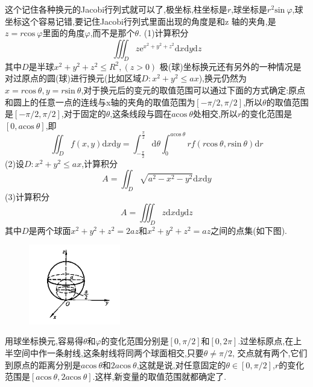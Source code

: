 \documentclass{ctexart}
\begin{document}
\tableofcontents
\newpage
\section{}

这个记住各种换元的Jacobi行列式就可以了,极坐标,柱坐标是$r$,球坐标是$r^{2}\mathrm{sin}\ \varphi$,球坐标这个容易记错,要记住Jacobi行列式里面出现的角度是和z 轴的夹角,是$z=r\mathrm{cos}\ \varphi$里面的角度$\varphi$,而不是那个$\theta$.
\newline
\newline
(1)计算积分$$\iiint_{D}z\mathrm{e}^{x^{2}+y^{2}+z^{2}}\mathrm{d}x\mathrm{d}y\mathrm{d}z$$
其中$D$是半球$x^{2}+y^{2}+z^{2}\leq R^{2},(z>0)$
\newline
\newline
极(球)坐标换元还有另外的一种情况是对过原点的圆(球)进行换元(比如区域$D:x^{2}+y^{2}\leq ax$),换元仍然为$x=r\mathrm{cos}\ \theta,y=r\mathrm{sin}\ \theta$,对于换元后的变元的取值范围可以通过下面的方式确定:原点和圆上的任意一点的连线与x轴的夹角的取值范围为$[-\pi/2,\pi/2]$,所以$\theta $的取值范围是$[-\pi/2,\pi/2]$,对于固定的$\theta$,这条线段与圆在$a\mathrm{cos}\ \theta$处相交,所以$r$的变化范围是$[0,a\mathrm{cos}\ \theta]$,即$$\iint_{D}f(x,y)\mathrm{d}x\mathrm{d}y=\int_{-\frac{\pi}{2}}^{\frac{\pi}{2}}\mathrm{d}\theta \int_{0}^{a\mathrm{cos}\ \theta}rf(r\mathrm{cos}\ \theta,r\mathrm{sin}\ \theta)\mathrm{d}r$$
\newline
\newline
(2)设$D:x^{2}+y^{2}\leq ax$,计算积分$$A=\iint_{D}\sqrt{a^{2}-x^{2}-y^{2}}\mathrm{d}x\mathrm{d}y$$
\newline
\newline
(3)计算积分$$A=\iiint_{D}z\mathrm{d}x\mathrm{d}y\mathrm{d}z$$其中$D$是两个球面$x^{2}+y^{2}+z^{2}=2az$和$x^{2}+y^{2}+z^{2}=az$之间的点集(如下图).
\begin{figure}[h!]
  \flushleft

  \includegraphics[width=4cm]{1.png}\\

\end{figure}
\newline
用球坐标换元,容易得$\theta$和$\varphi$的变化范围分别是$[0,\pi/2]$和$[0,2\pi]$.过坐标原点,在上半空间中作一条射线,这条射线将同两个球面相交,只要$\theta\neq\pi/2$, 交点就有两个,它们到原点的距离分别是$a\mathrm{cos}\ \theta$和$2a\mathrm{cos}\ \theta$,这就是说,对任意固定的$\theta \in [0,\pi/2]$,$r$的变化范围是$[a\mathrm{cos}\ \theta,2a\mathrm{cos}\ \theta]$.这样,新变量的取值范围就都确定了.
\end{document}
